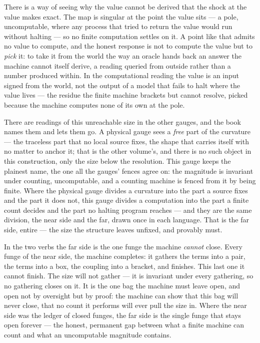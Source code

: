 There is a way of seeing why the value cannot be derived that the shock at the value makes exact. The map is singular at
the point the value sits --- a pole, uncomputable, where any process that tried to return the value would run without
halting --- so no finite computation settles on it. A point like that admits no value to compute, and the honest response
is not to compute the value but to \emph{pick} it: to take it from the world the way an oracle hands back an answer the
machine cannot itself derive, a reading queried from outside rather than a number produced within. In the computational
reading the value is an input signed from the world, not the output of a model that fails to halt where the value lives
--- the residue the finite machine brackets but cannot resolve, picked because the machine computes none of its own at
the pole.

There are readings of this unreachable size in the other gauges, and the book names them and lets them go. A physical
gauge sees a \emph{free} part of the curvature --- the traceless part that no local source fixes, the shape that carries
itself with no matter to anchor it; that is the other volume's, and there is no such object in this construction, only the
size below the resolution. This gauge keeps the plainest name, the one all the gauges' fences agree on: the magnitude is
invariant under counting, uncomputable, and a counting machine is fenced from it by being finite. Where the physical gauge
divides a curvature into the part a source fixes and the part it does not, this gauge divides a computation into the part
a finite count decides and the part no halting program reaches --- and they are the same division, the near side and the
far, drawn once in each language. That is the far side, entire --- the size the structure leaves unfixed, and provably
must.

In the two verbs the far side is the one funge the machine \emph{cannot} close. Every funge of the near side, the machine
completes: it gathers the terms into a pair, the terms into a box, the coupling into a bracket, and finishes. This last
one it cannot finish. The size will not gather --- it is invariant under every gathering, so no gathering closes on it. It
is the one bag the machine must leave open, and open not by oversight but by proof: the machine can show that this bag
will never close, that no count it performs will ever pull the size in. Where the near side was the ledger of closed
funges, the far side is the single funge that stays open forever --- the honest, permanent gap between what a finite
machine can count and what an uncomputable magnitude contains.

